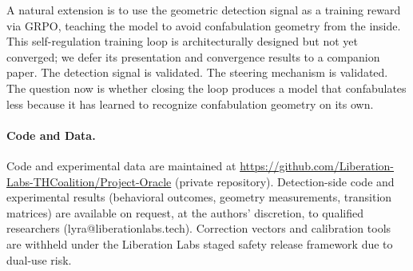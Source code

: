 A natural extension is to use the geometric detection signal as a
training reward via GRPO, teaching the model to avoid confabulation
geometry from the inside. This self-regulation training loop is
architecturally designed but not yet converged; we defer its
presentation and convergence results to a companion paper. The
detection signal is validated. The steering mechanism is validated.
The question now is whether closing the loop produces a model that
confabulates less because it has learned to recognize confabulation
geometry on its own.

\paragraph{Code and Data.}
Code and experimental data are maintained at
\url{https://github.com/Liberation-Labs-THCoalition/Project-Oracle}
(private repository). Detection-side code and experimental results
(behavioral outcomes, geometry measurements, transition matrices) are
available on request, at the authors' discretion, to qualified researchers (lyra@liberationlabs.tech). Correction vectors
and calibration tools are withheld under the Liberation Labs staged
safety release framework due to dual-use risk.
